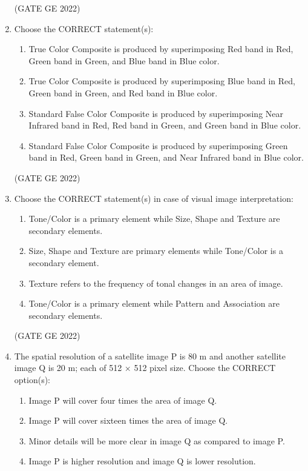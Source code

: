 \documentclass[journal,12pt,onecolumn]{IEEEtran}
\theoremstyle{remark}
\begin{document}
\begin{enumerate}
\hfill (GATE GE 2022)

\item Choose the CORRECT statement(s):
\begin{enumerate}
    \item True Color Composite is produced by superimposing Red band in Red, Green band in Green, and Blue band in Blue color.
    \item True Color Composite is produced by superimposing Blue band in Red, Green band in Green, and Red band in Blue color.
    \item Standard False Color Composite is produced by superimposing Near Infrared band in Red, Red band in Green, and Green band in Blue color.
    \item Standard False Color Composite is produced by superimposing Green band in Red, Green band in Green, and Near Infrared band in Blue color.
\end{enumerate}

\hfill (GATE GE 2022)

\item Choose the CORRECT statement(s) in case of visual image interpretation:
\begin{enumerate}
    \item Tone/Color is a primary element while Size, Shape and Texture are secondary elements.
    \item Size, Shape and Texture are primary elements while Tone/Color is a secondary element.
    \item Texture refers to the frequency of tonal changes in an area of image.
    \item Tone/Color is a primary element while Pattern and Association are secondary elements.
\end{enumerate}

\hfill (GATE GE 2022)

\item The spatial resolution of a satellite image P is 80 m and another satellite image Q is 20 m; each of 512 × 512 pixel size. Choose the CORRECT option(s):
\begin{enumerate}
    \item Image P will cover four times the area of image Q.
    \item Image P will cover sixteen times the area of image Q.
    \item Minor details will be more clear in image Q as compared to image P.
    \item Image P is higher resolution and image Q is lower resolution.
\end{enumerate}


\end{enumerate}
\end{document}

